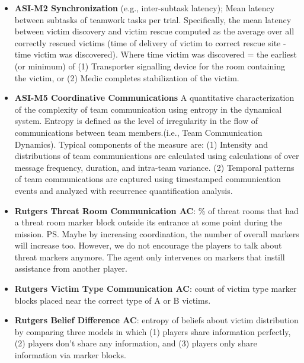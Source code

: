 \begin{itemize}

    \item \textbf{ASI-M2 Synchronization} (e.g., inter-subtask latency);
        Mean latency between subtasks of teamwork tasks per
        trial. Specifically, the mean latency between victim discovery and
        victim rescue computed as the average over all correctly rescued
        victims (time of delivery of victim to correct rescue site - time
        victim was discovered). Where time victim was discovered = the earliest
        (or minimum) of (1) Transporter signalling device for the room
        containing the victim, or (2) Medic completes stabilization of the
        victim.
 
    \item \textbf{ASI-M5 Coordinative Communications} A quantitative
        characterization of the complexity of team communication using entropy
        in the dynamical system. Entropy is defined as the level of
        irregularity in the flow of communications between team members.(i.e.,
        Team Communication Dynamics).  Typical components of the measure are:
        (1) Intensity and distributions of team communications are calculated
        using calculations of over message frequency, duration, and intra-team
        variance. (2) Temporal patterns of team communications are captured
        using timestamped communication events and analyzed with recurrence
        quantification analysis.

    \item \textbf{Rutgers Threat Room Communication AC}: \% of threat
        rooms that had a threat room marker block outside its entrance at some
        point during the mission. \ps{Maybe by increasing coordination, the number of overall markers will increase too. However, we do not encourage the players to talk about threat markers anymore. The agent only intervenes on markers that instill assistance from another player.}  

    \item \textbf{Rutgers Victim Type Communication AC}: count of
        victim type marker blocks placed near the correct type of A or B
        victims.
    
    \item \textbf{Rutgers Belief Difference AC}: entropy of beliefs about
        victim distribution by comparing three models in which (1) players
        share information perfectly, (2) players don't share any information,
        and (3) players only share information via marker blocks.  

\end{itemize}

